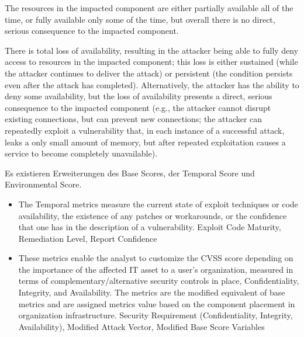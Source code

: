 \begin{description}[itemsep=1em,align=left]
\begin{description}[noitemsep,align=left]
                    The resources in the impacted component are either partially available all of the time, or fully available only some of the time, but overall there is no direct, serious consequence to the impacted component.
                \item [High:] There is total loss of availability, resulting in the attacker being able to fully deny access to resources in the impacted component; this loss is either sustained (while the attacker continues to deliver the attack) or persistent (the condition persists even after the attack has completed). 
                    Alternatively, the attacker has the ability to deny some availability, but the loss of availability presents a direct, serious consequence to the impacted component (e.g., the attacker cannot disrupt existing connections, but can prevent new connections; the attacker can repeatedly exploit a vulnerability that, in each instance of a successful attack, leaks a only small amount of memory, but after repeated exploitation causes a service to become completely unavailable).
            \end{description}
    \end{description}
    
    Es existieren Erweiterungen des Base Scores, der Temporal Score und Environmental Score. 
    \begin{itemize}
        \item The Temporal metrics measure the current state of exploit techniques or code availability, the existence of any patches or workarounds, or the confidence that one has in the description of a vulnerability. 
            Exploit Code Maturity, Remediation Level, Report Confidence
        \item These metrics enable the analyst to customize the CVSS score depending on the importance of the affected IT asset to a user's organization, measured in terms of complementary/alternative security controls in place, Confidentiality, Integrity, and Availability. 
            The metrics are the modified equivalent of base metrics and are assigned metrics value based on the component placement in organization infrastructure. 
            Security Requirement (Confidentiality, Integrity, Availability), Modified Attack Vector, Modified Base Score Variables
    \end{itemize}